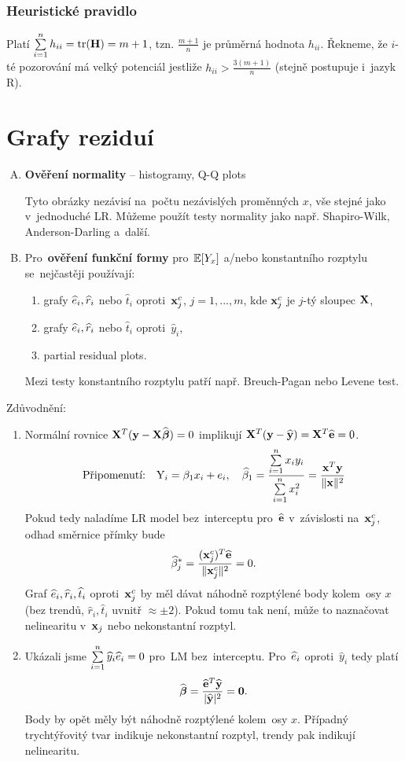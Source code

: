 \subsubsection{Heuristické pravidlo}
Platí $\sum\limits_{i=1}^{n} h_{ii} = \text{tr}(\textbf{H}) = m + 1$, tzn. $\frac{m+1}{n}$ je průměrná hodnota $h_{ii}$. Řekneme, že $i$-té pozorování má velký potenciál jestliže $h_{ii} > \frac{3(m+1)}{n}$ (stejně postupuje i~jazyk R).

\section{Grafy reziduí}
\begin{enumerate}[A)]
\item \textbf{Ověření normality} -- histogramy, Q-Q plots

Tyto obrázky nezávisí na~počtu nezávislých proměnných $x$, vše stejné jako v~jednoduché LR. Můžeme použít testy normality jako např. Shapiro-Wilk, Anderson-Darling a~další.
\item Pro~\textbf{ověření funkční formy} pro~$\mathbb{E} [Y_x]$ a/nebo konstantního rozptylu se~nejčastěji používají:
\begin{enumerate}[1)]
\item grafy $\widehat{e}_i, \widehat{r}_i$ nebo $\widehat{t}_i$ oproti~$\mathbf{x}_j^c$, $j = 1,..., m$, kde $\mathbf{x}_j^c$ je $j$-tý sloupec $\mathbf{X}$,
\item grafy $\widehat{e}_i, \widehat{r}_i$ nebo $\widehat{t}_i$ oproti~$\widehat{y}_i$,
\item partial residual plots.
\end{enumerate}
Mezi testy konstantního rozptylu patří např. Breuch-Pagan nebo Levene test.
\end{enumerate}

\begin{remark}
Zdůvodnění:
\begin{enumerate}
\item Normální rovnice $\mathbf{X}^T (\mathbf{y} - \mathbf{X} \widehat{\boldsymbol{\beta}}) = 0$ implikují $\mathbf{X}^T (\mathbf{y} - \widehat{\mathbf{y}}) = \mathbf{X}^T \widehat{\mathbf{e}} = 0$.
 $$
 \text{Připomenutí:} \quad \text{Y}_i = \beta_1 x_i + e_i, \quad \widehat{\beta}_1 = \frac{\sum\limits_{i=1}^{n} x_i y_i}{\sum\limits_{i=1}^{n} x_i^2} = \frac{\mathbf{x}^T\mathbf{y}}{\| \mathbf{x} \|^2 }
 $$
Pokud tedy naladíme LR model bez~interceptu pro~$\widehat{\mathbf{e}}$ v~závislosti na~$\mathbf{x}_j^c$, odhad směrnice přímky bude
 $$
  \widehat{\beta}_j^* = \frac{(\mathbf{x}_j^c)^T \widehat{\mathbf{e}}}{\| \mathbf{x}_j^c \|^2} = 0.
 $$
Graf $\widehat{e}_i, \widehat{r}_i, \widehat{t}_i$ oproti~$\mathbf{x}_j^c$ by měl dávat náhodně rozptýlené body kolem~osy $x$ (bez trendů, $\widehat{r}_i, \widehat{t}_i$ uvnitř $\approx \pm 2$).
Pokud tomu tak není, může to naznačovat nelinearitu v~$\mathbf{x}_j$ nebo nekonstantní rozptyl.
\item Ukázali jsme $\sum\limits_{i=1}^{n} \widehat{y}_i \widehat{e}_i = 0$ pro~LM bez~interceptu. Pro~$\widehat{e}_i$ oproti~$\widehat{y}_i$ tedy platí
 $$
  \widehat{\boldsymbol{\beta}} = \frac{\widehat{\mathbf{e}}^T \widehat{\mathbf{y}}}{| \widehat{\mathbf{y}} |^2} = \boldsymbol{0}.
 $$
Body by opět měly být náhodně rozptýlené kolem~osy $x$. Případný trychtýřovitý tvar indikuje nekonstantní rozptyl, trendy pak indikují nelinearitu.
\end{enumerate}	
\end{remark}

